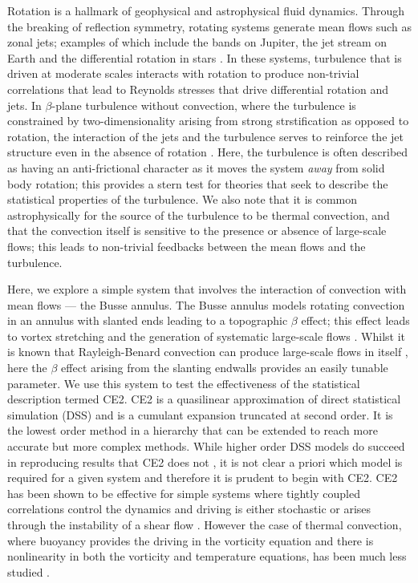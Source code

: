 \documentclass{jfm}
\begin{document}
Rotation is a hallmark of geophysical and astrophysical fluid dynamics.
Through the breaking of reflection symmetry, rotating systems generate mean flows such as zonal jets; examples of which include the bands on Jupiter, the jet stream on Earth and the differential rotation in stars \citep{galperin_read_2019}.
In these systems, turbulence that is driven at moderate scales interacts with rotation to produce non-trivial correlations that lead to Reynolds stresses that drive differential rotation and jets. In $\beta$-plane turbulence without convection, where the turbulence is constrained by two-dimensionality arising from strong strstification as opposed to rotation, the interaction of the jets and the turbulence serves to reinforce the jet structure even in the absence of rotation \citep[see][figure 25.1]{farrel_ioannou_2019}. Here, the turbulence is often described as having an anti-frictional character as it moves the system \textit{away} from solid body rotation; this provides a stern test for theories that seek to describe the statistical properties of the turbulence. We also note that it is common astrophysically for the source of the turbulence to be thermal convection, and that the convection itself is sensitive to the presence or absence of large-scale flows; this leads to non-trivial feedbacks between the mean flows and the turbulence.

Here, we explore a simple system that involves the interaction of convection with mean flows --- the Busse annulus. The Busse annulus models rotating convection in an annulus with slanted ends leading to a topographic $\beta$ effect; this effect leads to vortex stretching and the generation of systematic large-scale flows 
\citep[see e.g.][]{1976Icar...29..255B,bh1993,rj2006}. Whilst it is known that Rayleigh-Benard convection can produce large-scale flows in itself \citep[e.g.][]{1970JAtS...27.1107T,2014JFM...759..360G}, here the $\beta$ effect arising from the slanting endwalls provides an easily tunable parameter. We use this system to test the effectiveness of the statistical description termed CE2. CE2 is a quasilinear approximation of direct statistical simulation (DSS) and is a cumulant expansion truncated at second order. It is the lowest order method in a hierarchy that can be extended to reach more accurate but more complex methods. While higher order DSS models do succeed in reproducing results that CE2 does not \citep[see][for a recent review]{2022arXiv220505513M}, it is not clear a priori which model is required for a given system \citep[even for simple systems, e.g.][]{2022Chaos..32d3111L} and therefore it is prudent to begin with CE2. CE2 has been shown to be effective for simple systems where tightly coupled correlations control the dynamics and driving is either stochastic \citep[e. g.][]{2007JAtS...64.3652F, 2013PhRvL.110j4502T} or arises through the instability of a shear flow \citep[e.g.][]{2008JAtS...65.1955M}. However the case of thermal convection, where buoyancy provides the driving in the vorticity equation and there is nonlinearity in both the vorticity and temperature equations, has been much less studied \citep[though we note][studied stably stratified Boussinesq dynamics with S3T]{2018JFM...854..544F,2018JAtS...75.4201F}. 
\end{document}
